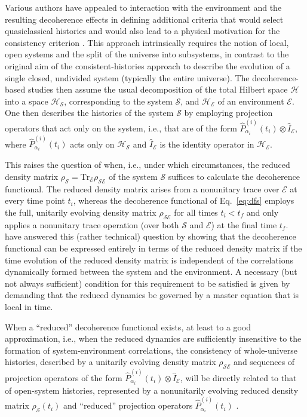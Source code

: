 \documentclass[twocolumn,rmp,aps,amsmath,amsfonts,noshowkeys,noshowpacs]{revtex4}
\begin{document}
Various authors have appealed to  interaction with the environment
and the resulting decoherence effects in defining additional criteria
that would select quasiclassical histories and would also lead to a
physical motivation for the consistency criterion \citep[see, for
example,][]{GellMann:1990:uz,Dowker:1992:vz,Albrecht:1992:rz,%
Albrecht:1993:pq,Zurek:1993:pu,Paz:1993:ww,Twamley:1993:bz,%
Finkelstein:1993:gc,Anastopoulos:1996:kl,GellMann:1998:xy,Halliwell:2001:qp}.
This approach intrinsically requires the notion of local, open systems
and the split of the universe into subsystems, in contrast to the
original aim of the consistent-histories approach to describe the
evolution of a single closed, undivided system (typically the entire
universe). The decoherence-based studies then assume the usual
decomposition of the total Hilbert space $\mathcal{H}$ into a space
$\mathcal{H}_\mathcal{S}$, corresponding to the system $\mathcal{S}$,
and $\mathcal{H}_\mathcal{E}$ of an environment $\mathcal{E}$. One
then describes the histories of the system $\mathcal{S}$ by employing
projection operators that act only on the system, i.e., that are of
the form $\widehat{P}^{(i)}_{\alpha_i}(t_i) \otimes
\widehat{I}_\mathcal{E}$, where $\widehat{P}^{(i)}_{\alpha_i}(t_i)$
acts only on $\mathcal{H}_\mathcal{S}$ and $\widehat{I}_\mathcal{E}$
is the identity operator in $\mathcal{H}_\mathcal{E}$.

This raises the question of when, i.e., under which circumstances, the
reduced density matrix $\rho_\mathcal{S} = \text{Tr}_\mathcal{E}
\rho_\mathcal{SE}$ of the system $\mathcal{S}$ suffices to calculate
the decoherence functional. The reduced density matrix arises from a
nonunitary trace over $\mathcal{E}$ at every time point $t_i$, whereas
the decoherence functional of Eq.~\eqref{eq:dfs} employs the full,
unitarily evolving density matrix $\rho_\mathcal{SE}$ for all times
$t_i < t_f$ and only applies a nonunitary trace operation (over both
$\mathcal{S}$ and $\mathcal{E}$) at the final time $t_f$.
\citet{Paz:1993:ww} have answered this (rather technical) question by
showing that the decoherence functional can be expressed entirely in
terms of the reduced density matrix if the time evolution of the
reduced density matrix is independent of the correlations dynamically
formed between the system and the environment. A necessary (but not
always sufficient) condition for this requirement to be satisfied is
given by demanding that the reduced dynamics be governed by a master
equation that is local in time.

When a ``reduced'' decoherence functional exists, at least to a good
approximation, i.e., when the reduced dynamics are sufficiently
insensitive to the formation of system-environment correlations, the
consistency of whole-universe histories, described by a unitarily
evolving density matrix $\rho_\mathcal{SE}$ and sequences of
projection operators of the form $\widehat{P}^{(i)}_{\alpha_i}(t_i)
\otimes \widehat{I}_\mathcal{E}$, will be directly related to that of
open-system histories, represented by a nonunitarily evolving reduced
density matrix $\rho_\mathcal{S}(t_i)$ and ``reduced'' projection
operators $\widehat{P}^{(i)}_{\alpha_i}(t_i)$ \citep{Zurek:1993:pu}.
\end{document}
